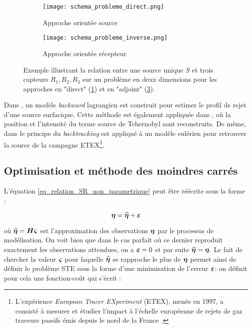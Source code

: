  \begin{figure}[h]
 	\begin{subfigure}{0.5\textwidth}
 		\texttt{[image: schema\_probleme\_direct.png]}
 		\caption{Approche orientée source}
 		\label{schema_probleme_direct}
 	\end{subfigure}
 	\begin{subfigure}{0.5\textwidth}
 		\texttt{[image: schema\_probleme\_inverse.png]}
 		\caption{Approche orientée récepteur}
 		\label{schema_probleme_inverse}
 	\end{subfigure}
 	\caption{Exemple illustrant la relation entre une source unique $S$ et trois capteurs $R_1,R_2,R_3$ sur un problème en deux dimensions pour les approches en "direct" (\ref{schema_probleme_direct}) et en "adjoint" (\ref{schema_probleme_inverse}). }
 \end{figure}
 
 Dans \cite{Flesch1995}, un modèle \textit{backward} lagrangien est construit pour estimer le profil de rejet d'une source surfacique.  Cette méthode est également appliquée dans \cite{Pudykiewicz1998}, où la position et l'intensité du terme source de Tchernobyl sont reconstruits. De même, dans \cite{Hourdin2006b} le principe du \textit{backtracking} est appliqué à un modèle eulérien pour retrouver la source de la campagne ETEX\footnote{L’expérience \textit{European Tracer EXperiment} (ETEX), menée en 1997,  a consisté à mesurer et étudier l'impact à l'échelle européenne de rejets de gaz traceurs passifs émis depuis le nord de la France \cite{Nodop1998}.}.\\
 
 \subsection{Optimisation et méthode des moindres carrés}
 \label{subsection_MCO}
 
 L'équation \eqref{eq_relation_SR_non_parametrique} peut être réécrite sous la forme : 
 
 \begin{equation}
 {\bm{\eta}} = \widehat{{\bm{\eta}}} + {\bm{\varepsilon}}
 \label{eq_relation_SR_nonparam_simple}
 \end{equation}

où $\widehat{{\bm{\eta}}} = {\bm{H}} {\bm{\varsigma}}$ est l'approximation des observations ${\bm{\eta}}$ par le processus de modélisation. On voit bien que dans le cas parfait où ce dernier reproduit exactement les observations attendues, on a ${\bm{\varepsilon}} = 0$ et par suite $\widehat{{\bm{\eta}}} = {\bm{\eta}}$. Le fait de chercher la valeur ${\bm{\varsigma}}$ pour laquelle $\widehat{{\bm{\eta}}}$ se rapproche le plus de ${\bm{\eta}}$ permet ainsi de définir le problème STE sous la forme d'une minimisation de l'erreur ${\bm{\varepsilon}}$: on définit pour cela une fonction-coût qui s'écrit : 

